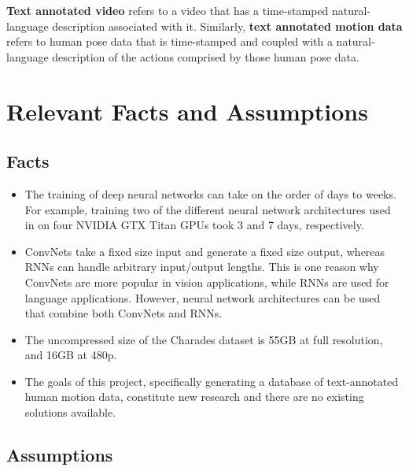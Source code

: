 \documentclass{scrreprt}
\begin{document}
\textbf{Text annotated video} refers to a video that has a time-stamped
natural-language description associated with it. Similarly, \textbf{text
annotated motion data} refers to human pose data that is time-stamped and
coupled with a natural-language description of the actions comprised by those
human pose data.

\section{Relevant Facts and Assumptions}

\subsection{Facts}

\begin{itemize}
        \item The training of deep neural networks can take on the order of
                days to weeks. For example, training two of the different
                neural network architectures used in
                \cite{DBLP:journals/corr/PfisterCZ15} on four NVIDIA GTX Titan
                GPUs took 3 and 7 days, respectively.
        \item ConvNets take a fixed size input and generate a fixed size
                output, whereas RNNs can handle arbitrary input/output lengths.
                This is one reason why ConvNets are more popular in vision
                applications, while RNNs are used for language applications.
                However, neural network architectures can be used that combine
                both ConvNets and RNNs.
        \item The uncompressed size of the Charades dataset is 55GB at full
                resolution, and 16GB at 480p.
        \item The goals of this project, specifically generating a database of
                text-annotated human motion data, constitute new research and
                there are no existing solutions available.
\end{itemize}

\subsection{Assumptions}
\end{document}
